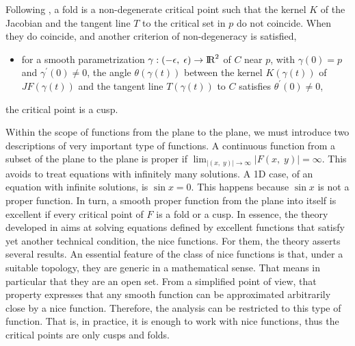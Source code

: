 \documentclass[journal=iecred,manuscript=article]{achemso}
\theoremstyle{definition}
\theoremstyle{remark}
\begin{document}
Following \citet{malta1993}, 
% 
a fold is a non-degenerate critical point such that
%
the kernel $ K $ of the Jacobian and the tangent line $ T $ to the critical set in $ p $ do not coincide. When they do coincide, 
and another
criterion of non-degeneracy is satisfied, 
%
\begin{itemize}
\item for a smooth parametrization $ \gamma : \left( -\epsilon, \; \epsilon \right) \to {\text{I\!R}}^2 $ of $ C $ near $ p $, with $ \gamma \left(0\right) = p $ and $ \gamma^{\prime} \left(0\right) \neq 0 $, the angle $ \theta\left(\gamma\left(t\right)\right) $ between the kernel $ K\left(\gamma\left(t\right)\right) $ of $ JF\left(\gamma\left(t\right)\right) $ and the tangent line $ T\left(\gamma\left(t\right)\right) $ to $ C $ satisfies $ \theta^{\prime}\left(0\right) \neq 0 $,
\end{itemize}
the critical point  is a cusp.

Within the scope of  functions from the plane to the plane, we 
must introduce two descriptions of very important type of 
functions. 
A continuous function from a subset of the plane to the plane 
is proper if  $\lim_{\vert\left(x,\;y\right)\vert\to\infty} \vert F\left(x,\;y\right)\vert = \infty$. This avoids to
treat equations with infinitely many solutions. A 1D case, of an equation with infinite solutions, is $\sin x=0$. This happens because $\sin x$ is not a proper function. 
%
In turn, a smooth proper function from the plane into itself is excellent if every critical point of $ F $ is a fold or a cusp. In essence, the theory developed in \citet{malta} aims
at solving equations defined by excellent functions that 
satisfy yet another technical condition, the nice 
functions. For them, the theory 
asserts several results. 
An essential feature of the class of nice functions 
is that, under a suitable topology, they are generic
in a mathematical sense.
That means in particular
that they are an open set. From a simplified point of view, 
that property expresses that any smooth
function can be approximated arbitrarily close by a nice function. 
 Therefore,
the analysis can be restricted to this type of function.
That is, in practice, it is enough to work 
with nice functions, thus the critical points are only 
cusps and folds.


\end{document}
